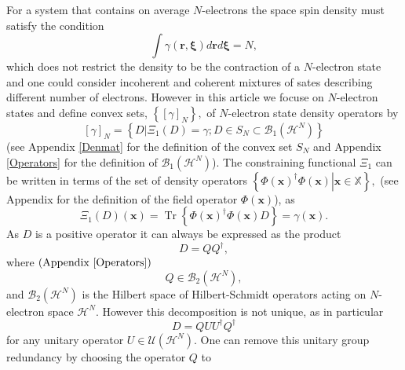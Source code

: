 \documentclass[aps,preprint]{revtex4}%
\begin{document}
For a system that contains on average $N$-electrons the space spin density
must satisfy the condition
\begin{equation}
\int\gamma\left(  \mathbf{r,\xi}\right)  d\mathbf{r}d\mathbf{\xi
}=N,\label{Number}%
\end{equation}
which does not restrict the density to be the contraction of a $N$-electron
state and one could consider incoherent and coherent mixtures of sates
describing different number of electrons. However in this article we focuse on
$N$-electron states and define convex sets, $\left\{  \left[  \gamma\right]
_{N}\right\}  ,$ of $N$-electron state density operators by
\begin{equation}
\left[  \gamma\right]  _{N}=\left\{  \left.  D\right\vert \Xi_{1}\left(
D\right)  =\gamma;D\in S_{N}\subset\mathcal{B}_{1}\left(  \mathcal{H}%
^{N}\right)  \right\}
\end{equation}
(see Appendix \ref{Denmat} for the definition of the convex set $S_{N}$ and
Appendix \ref{Operators} for the definition of $\mathcal{B}_{1}\left(
\mathcal{H}^{N}\right)  $). The constraining functional $\Xi_{1}$ can be
written in terms of the set of density operators $\left\{  \left.  \Phi\left(
\mathbf{x}\right)  ^{\dagger}\Phi\left(  \mathbf{x}\right)  \right\vert
\mathbf{x\in}\mathbb{X}\right\}  ,$ (see Appendix for the definition of the
field operator $\Phi\left(  \mathbf{x}\right)  $), as
\begin{equation}
\Xi_{1}\left(  D\right)  \left(  \mathbf{x}\right)  =\operatorname{Tr}\left\{
\Phi\left(  \mathbf{x}\right)  ^{\dagger}\Phi\left(  \mathbf{x}\right)
D\right\}  =\gamma\left(  \mathbf{x}\right)  .
\end{equation}
As $D$ is a positive operator it can always be expressed as the product
\begin{equation}
D=QQ^{\dagger},
\end{equation}
where $\left(  \text{Appendix \ref{Operators}}\right)  $
\begin{equation}
Q\in\mathcal{B}_{2}\left(  \mathcal{H}^{N}\right)  ,
\end{equation}
and $\mathcal{B}_{2}\left(  \mathcal{H}^{N}\right)  $ is the Hilbert space of
Hilbert-Schmidt operators acting on $N$-electron space $\mathcal{H}^{N}$.
However this decomposition is not unique, as in particular
\begin{equation}
D=QUU^{\dagger}Q^{\dagger}%
\end{equation}
for any unitary operator $U\in\mathcal{U}\left(  \mathcal{H}^{N}\right)  $.
One can remove this unitary group redundancy by choosing the operator $Q$ to
\end{document}
